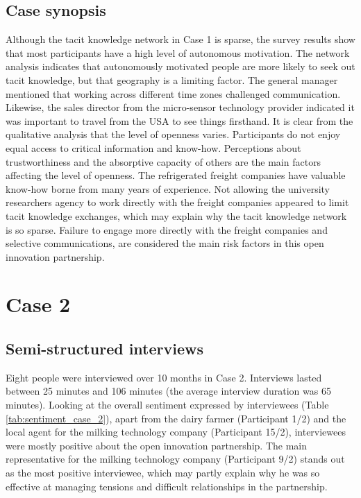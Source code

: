 \subsection{Case synopsis}

Although the tacit knowledge network in Case 1 is sparse, the survey results show that most participants have a high level of autonomous motivation. The network analysis indicates that autonomously motivated people are more likely to seek out tacit knowledge, but that geography is a limiting factor. The general manager mentioned that working across different time zones challenged communication. Likewise, the sales director from the micro-sensor technology provider indicated it was important to travel from the USA to see things firsthand. It is clear from the qualitative analysis that the level of openness varies. Participants do not enjoy equal access to critical information and know-how. Perceptions about trustworthiness and the absorptive capacity of others are the main factors affecting the level of openness. The refrigerated freight companies have valuable know-how borne from many years of experience. Not allowing the university researchers agency to work directly with the freight companies appeared to limit tacit knowledge exchanges, which may explain why the tacit knowledge network is so sparse. Failure to engage more directly with the freight companies and selective communications, are considered the main risk factors in this open innovation partnership.

\section{Case 2}

\subsection{Semi-structured interviews}

Eight people were interviewed over 10 months in Case 2. Interviews lasted between 25 minutes and 106 minutes (the average interview duration was 65 minutes). Looking at the overall sentiment expressed by interviewees (Table \ref{tab:sentiment_case_2}), apart from the dairy farmer (Participant 1/2) and the local agent for the milking technology company (Participant 15/2), interviewees were mostly positive about the open innovation partnership. The main representative for the milking technology company (Participant 9/2) stands out as the most positive interviewee, which may partly explain why he was so effective at managing tensions and difficult relationships in the partnership.

